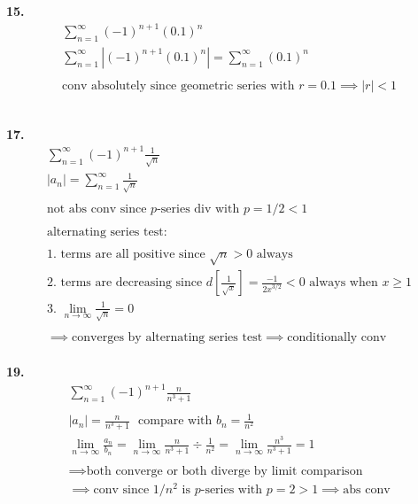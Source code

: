 \documentclass{article}
\begin{document}
\noindent
\textbf{15.}
\begin{gather*}
\sum_{n=1}^{\infty} (-1)^{n+1} (0.1)^n
\\
\sum_{n=1}^{\infty} \left| (-1)^{n+1} (0.1)^n \right|
= \sum_{n=1}^{\infty} (0.1)^n
\\
\\
\text{conv absolutely since geometric series with } r=0.1 \implies |r|<1
\end{gather*}
\hfill
\\



\newpage



\noindent
\textbf{17.}
\begin{gather*}
\sum_{n=1}^{\infty} (-1)^{n+1} \frac{1}{\sqrt{n}}
\\
\left| a_n \right|
=
\sum_{n=1}^{\infty} \frac{1}{\sqrt{n}}
\\
\\
\text{not abs conv since $p$-series div with } p=1/2<1
\\
\\
\text{alternating series test:}
\\
\\
\text{1. terms are all positive since } \sqrt{n}>0 \text{~always}
\\
\text{2. terms are decreasing since }
d \left[ \frac{1}{\sqrt{x}} \right] = \frac{-1}{2x^{3/2}} < 0 \text{~always when } x \geq 1
\\
\text{3. }
\lim_{n \to \infty} \frac{1}{\sqrt{n}} = 0
\\
\\
\implies \text{converges by alternating series test}
\implies \text{conditionally conv}
\end{gather*}
\hfill
\\




\noindent
\textbf{19.}
\begin{gather*}
\sum_{n=1}^{\infty} (-1)^{n+1} \frac{n}{n^3+1}
\\
\\
|a_n|= \frac{n}{n^3+1} \text{ ~compare with } b_n = \frac{1}{n^2}
\\
\lim_{n \to \infty} \frac{a_n}{b_n}
=\lim_{n \to \infty} \frac{n}{n^3+1} \div \frac{1}{n^2}
=\lim_{n \to \infty} \frac{n^3}{n^3+1}=1
\\
\\
\implies \text{both converge or both diverge by limit comparison}
\\
\implies \text{conv since $1/n^2$ is $p$-series with $p=2>1$}
\implies \text{abs conv}
\end{gather*}
\hfill
\\
\end{document}
